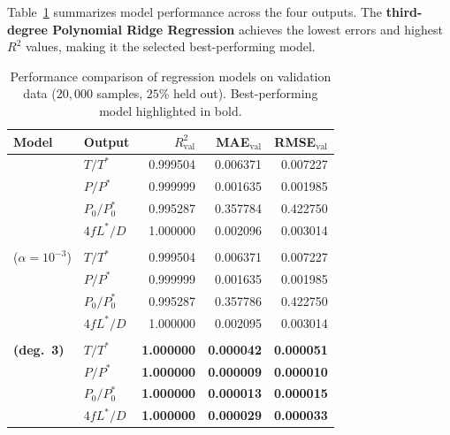 \documentclass[11pt,a4paper]{report}
\begin{document}
Table~\ref{tab:model_comparison} summarizes model performance across the four outputs. The \textbf{third-degree Polynomial Ridge Regression} achieves the lowest errors and highest $R^2$ values, making it the selected best-performing model.

\begin{table}[htbp]
\centering
\small
\setlength{\tabcolsep}{7pt}
\renewcommand{\arraystretch}{1.12}
\caption{Performance comparison of regression models on validation data ($20{,}000$ samples, $25\%$ held out). Best-performing model highlighted in bold.}
\label{tab:model_comparison}
\begin{tabular}{@{} >{\raggedright\arraybackslash}p{2.6cm} l r r r @{}}
\toprule
\textbf{Model} & \textbf{Output} & \textbf{$R^2_\text{val}$} & \textbf{MAE$_\text{val}$} & \textbf{RMSE$_\text{val}$} \\
\midrule
\multirow{4}{=}{\raggedright Linear}
  & $T/T^*$     & 0.999504 & 0.006371 & 0.007227 \\
  & $P/P^*$     & 0.999999 & 0.001635 & 0.001985 \\
  & $P_0/P_0^*$ & 0.995287 & 0.357784 & 0.422750 \\
  & $4fL^*/D$   & 1.000000 & 0.002096 & 0.003014 \\
\addlinespace
\multirow{4}{=}{\raggedright Ridge\\[1pt]\scriptsize($\alpha=10^{-3}$)}
  & $T/T^*$     & 0.999504 & 0.006371 & 0.007227 \\
  & $P/P^*$     & 0.999999 & 0.001635 & 0.001985 \\
  & $P_0/P_0^*$ & 0.995287 & 0.357786 & 0.422750 \\
  & $4fL^*/D$   & 1.000000 & 0.002095 & 0.003014 \\
\addlinespace
\multirow{4}{=}{\raggedright\textbf{Poly-Ridge}\\[1pt]\scriptsize\textbf{(deg.\ 3)}}
  & \textbf{$T/T^*$}     & \textbf{1.000000} & \textbf{0.000042} & \textbf{0.000051} \\
  & \textbf{$P/P^*$}     & \textbf{1.000000} & \textbf{0.000009} & \textbf{0.000010} \\
  & \textbf{$P_0/P_0^*$} & \textbf{1.000000} & \textbf{0.000013} & \textbf{0.000015} \\
  & \textbf{$4fL^*/D$}   & \textbf{1.000000} & \textbf{0.000029} & \textbf{0.000033} \\
\bottomrule
\end{tabular}
\end{table}
\end{document}
